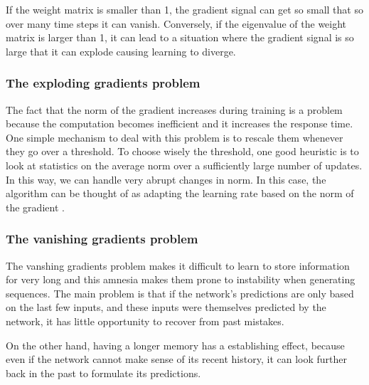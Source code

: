 If the  weight matrix is smaller than 1, the gradient signal can get so small that so over many time steps it can vanish. Conversely, if the eigenvalue of the weight matrix is larger than 1, it can lead to a situation where the gradient signal is so large that it can explode causing learning to diverge. 


\subsubsection*{The exploding gradients problem}
 The fact that the norm of the gradient increases during training is a problem because the computation becomes inefficient and it increases the response time. One simple mechanism to deal with this problem is to rescale them whenever they go over a threshold. To choose wisely the threshold, one good heuristic is to look at statistics on the average norm over a sufficiently large number of updates. In this way, we can handle very abrupt changes in norm. In this case, the algorithm can be thought of as adapting the learning rate based on the norm of the gradient  \cite{pascanu2013difficulty}.

\subsubsection*{The vanishing gradients problem}

The vanshing gradients problem makes it difficult to learn to store information for very long and this amnesia makes them prone to instability when generating sequences. The main problem is that if the network's predictions  are only based on the last few inputs, and these inputs were themselves predicted by the network, it has little opportunity to recover from past mistakes.

On the other hand, having a longer memory has a establishing effect, because even if the network cannot make sense of its recent history, it can look further back in the past to formulate its predictions. \cite{graves2013generating}

